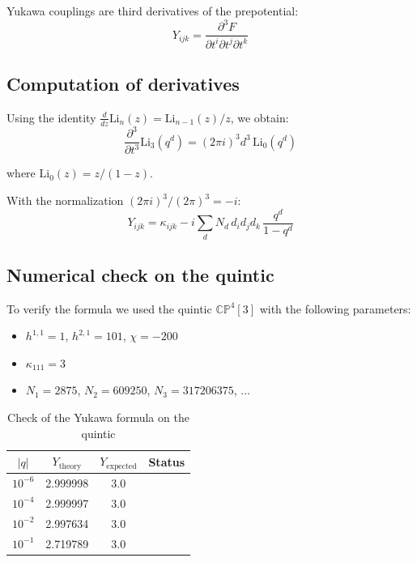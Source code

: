 \documentclass[12pt,a4paper,twoside]{article}
\newcommand{\checkmarkgreen}{\textcolor{emerald}{\checkmark}}
\theoremstyle{definition}
\begin{document}
Yukawa couplings are third derivatives of the prepotential:
\begin{equation}
Y_{ijk} = \frac{\partial^3 F}{\partial t^i \partial t^j \partial t^k}
\label{eq:yukawa_derivative}
\end{equation}

\subsection{Computation of derivatives}

Using the identity $\frac{d}{dz}\text{Li}_n(z) = \text{Li}_{n-1}(z)/z$, we obtain:
\begin{equation}
\frac{\partial^3}{\partial t^3} \text{Li}_3(q^d) = (2\pi i)^3 d^3 \, \text{Li}_0(q^d)
\end{equation}

where $\text{Li}_0(z) = z/(1-z)$.

With the normalization $(2\pi i)^3/(2\pi)^3 = -i$:
\begin{equation}
\boxed{
Y_{ijk} = \kappa_{ijk} - i \sum_d N_d \, d_i d_j d_k \, \frac{q^d}{1 - q^d}
}
\label{eq:yukawa_final}
\end{equation}

\subsection{Numerical check on the quintic}

To verify the formula we used the quintic $\mathbb{CP}^4[3]$ with the following parameters:
\begin{itemize}
    \item $h^{1,1} = 1$, $h^{2,1} = 101$, $\chi = -200$
    \item $\kappa_{111} = 3$
    \item $N_1 = 2875$, $N_2 = 609250$, $N_3 = 317206375$, ...
\end{itemize}

\begin{table}[H]
\centering
\small
\caption{Check of the Yukawa formula on the quintic}
\label{tab:yukawa_check}
\begin{tabular}{c|c|c|c}
\toprule
\textbf{$|q|$} & \textbf{$Y_{\text{theory}}$} & \textbf{$Y_{\text{expected}}$} & \textbf{Status} \\
\midrule
$10^{-6}$ & 2.999998 & 3.0 & \checkmarkgreen \\
$10^{-4}$ & 2.999997 & 3.0 & \checkmarkgreen \\
$10^{-2}$ & 2.997634 & 3.0 & \checkmarkgreen \\
$10^{-1}$ & 2.719789 & 3.0 & \checkmarkgreen \\
\bottomrule
\end{tabular}
\end{table}
\end{document}
